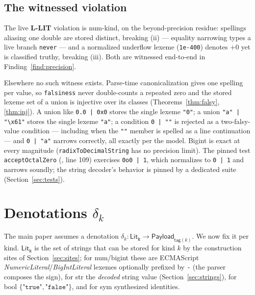 \documentclass[11pt]{article}
\newcommand{\Payload}{\mathsf{Payload}}
\newcommand{\tagfn}{\mathsf{tag}}
\newcommand{\Lit}[1]{\mathsf{Lit}_{\texttt{#1}}}
\begin{document}
\subsection{The witnessed violation}
\label{sec:witnesses}

The live \textbf{L-LIT} violation is num-kind, on the beyond-precision
residue: spellings aliasing one double are stored distinct, breaking
(ii) --- equality narrowing types a live branch \texttt{never} --- and a
normalized underflow lexeme (\texttt{1e-400}) denotes $+0$ yet is
classified truthy, breaking (iii). Both are witnessed end-to-end in
Finding~\ref{find:precision}.

Elsewhere no such witness exists. Parse-time canonicalization gives one
spelling per value, so \texttt{falsiness} never double-counts a repeated
zero and the stored lexeme set of a union is injective over its classes
(Theorems~\ref{thm:falsy}, \ref{thm:inj}). A union like
\texttt{0.0 | 0x0} stores the single lexeme \texttt{"0"}; a union
\texttt{"a" | "\textbackslash x61"} stores the single lexeme
\texttt{"a"}; a condition \texttt{0 | ""} is rejected as a
two-falsy-value condition --- including when the \texttt{""} member is
spelled as a line continuation --- and \texttt{0 | "a"} narrows
correctly, all exactly per the model. Bigint is exact at every magnitude
(\texttt{radixToDecimalString} has no precision limit). The pinned test
\texttt{acceptOctalZero}
(, line 109)
exercises \texttt{0o0 | 1}, which normalizes to \texttt{0 | 1} and
narrows soundly; the string decoder's behavior is pinned by a dedicated
suite (Section~\ref{sec:tests}).

\section{Denotations $\delta_k$}
\label{sec:denotations}

The main paper assumes a denotation
$\delta_k : \Lit{k} \to \Payload_{\tagfn(k)}$. We now fix it per kind.
$\Lit{k}$ is the set of strings that can be stored for kind $k$ by the
construction sites of Section~\ref{sec:sites}; for num/bigint these are
ECMAScript \emph{NumericLiteral}/\emph{BigIntLiteral} lexemes optionally
prefixed by \texttt{-} (the parser composes the sign), for str the
\emph{decoded} string value (Section~\ref{sec:strings}), for bool
$\{\texttt{"true"},\texttt{"false"}\}$, and for sym synthesized
identities.
\end{document}
